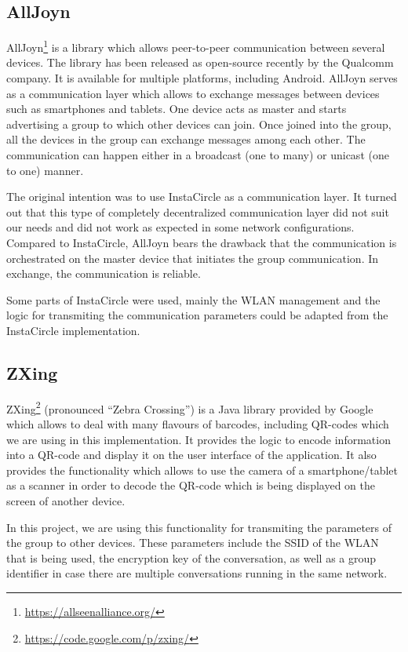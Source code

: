 \documentclass[numbers=noenddot, abstract=on, a4paper, headsepline,
footsepline, oneside, draft=off]{scrreprt}
\begin{document}
\subsection{AllJoyn}
AllJoyn\footnote{\url{https://allseenalliance.org/}} is a library which allows
peer-to-peer communication between several devices. The library has been
released as open-source recently by the Qualcomm company. It is available for
multiple platforms, including Android. AllJoyn serves as a communication layer
which allows to exchange messages between devices such as smartphones and
tablets. One device acts as master and starts advertising a group to which other
devices can join. Once joined into the group, all the devices in the group can
exchange messages among each other. The communication can happen either in a
broadcast (one to many) or unicast (one to one) manner.

The original intention was to use InstaCircle \cite{ritter13a} as a
communication layer. It turned out that this type of completely decentralized
communication layer did not suit our needs and did not work as expected in some
network configurations. Compared to InstaCircle, AllJoyn bears the drawback that
the communication is orchestrated on the master device that initiates the group
communication. In exchange, the communication is reliable.

Some parts of InstaCircle were used, mainly the WLAN management and the logic
for transmiting the communication parameters could be adapted from the
InstaCircle implementation.

\subsection{ZXing}
ZXing\footnote{\url{https://code.google.com/p/zxing/}} (pronounced ``Zebra
Crossing'') is a Java library provided by Google which allows to deal with many
flavours of barcodes, including QR-codes which we are using in this
implementation. It provides the logic to encode information into a QR-code and
display it on the user interface of the application. It also provides the
functionality which allows to use the camera of a smartphone/tablet as a scanner
in order to decode the QR-code which is being displayed on the screen of another
device.

In this project, we are using this functionality for transmiting the parameters
of the group to other devices. These parameters include the SSID of the WLAN
that is being used, the encryption key of the conversation, as well as a group
identifier in case there are multiple conversations running in the same network.
\end{document}
